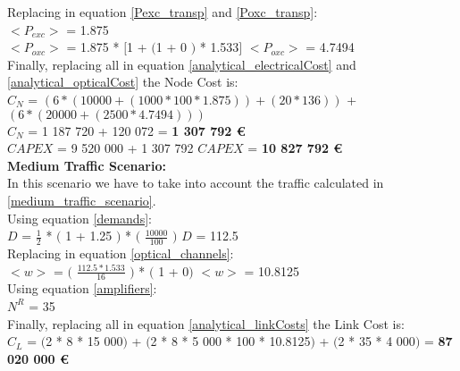 Replacing in equation \ref{Pexc_transp} and \ref{Poxc_transp}:\\

$<P_{exc}>$ = 1.875\\

$<P_{oxc}>$ = 1.875 * $[$1 + $($1 + $0$ $)$ * 1.533$]$ \qquad \quad $<P_{oxc}>$ = 4.7494 \\

Finally, replacing all in equation \ref{analytical_electricalCost} and \ref{analytical_opticalCost} the Node Cost is:\\

$C_N$ = $\left(6 * (10 000 + (1 000 * 100 * 1.875)) + (20 * 136)\right)$ + $\left(6 * (20 000 + (2 500 * 4.7494 )) \right)$\\

$C_N$ = 1 187 720 + 120 072 = \textbf{1 307 792 \euro}\\

$CAPEX$ = 9 520 000 + 1 307 792 \qquad \qquad $CAPEX$ = \textbf{10 827 792 \euro}\\

\textbf{Medium Traffic Scenario:}\\

In this scenario we have to take into account the traffic calculated in \ref{medium_traffic_scenario}.\\

Using equation \ref{demands}:\\

$D$ = $\frac{1}{2}$ * $($ 1 + 1.25 $)$ * $($ $\frac{10000}{100}$ $)$ \qquad \qquad $D$ = 112.5\\

Replacing in equation \ref{optical_channels}:\\

$<w>$ = $($ $\frac{112.5 * 1.533}{16}$ $)$ * $($ 1 + 0$)$ \qquad \qquad $<w>$ = 10.8125\\

Using equation \ref{amplifiers}:\\

$N^R$ = 35\\

Finally, replacing all in equation \ref{analytical_linkCosts} the Link Cost is:\\

$C_L$ = $($2 * 8 * 15 000$)$ + $($2 * 8 * 5 000 * 100 * 10.8125$)$ + $($2 * 35 * 4 000$)$ = \textbf{87 020 000 \euro}\\

